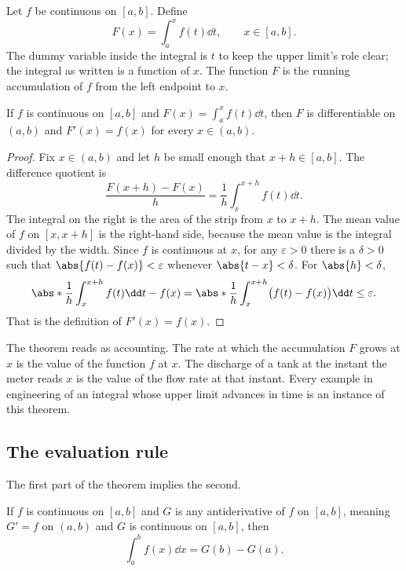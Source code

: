 Let $f$ be continuous on $[a,b]$. Define
\[
F(x) = \int_{a}^{x} f(t) \dd t, \qquad x \in [a,b].
\]
The dummy variable inside the integral is $t$ to keep the upper
limit's role clear; the integral as written is a function of $x$.
The function $F$ is the running accumulation of $f$ from the left
endpoint to $x$.

\begin{theorem}
If $f$ is continuous on $[a,b]$ and $F(x) = \int_{a}^{x} f(t) \dd t$,
then $F$ is differentiable on $(a,b)$ and
$F'(x) = f(x)$ for every $x \in (a,b)$.
\end{theorem}

\begin{proof}
Fix $x \in (a,b)$ and let $h$ be small enough that $x + h \in [a,b]$.
The difference quotient is
\[
\frac{F(x+h) - F(x)}{h} = \frac{1}{h} \int_{x}^{x+h} f(t) \dd t.
\]
The integral on the right is the area of the strip from $x$ to
$x + h$. The mean value of $f$ on $[x, x+h]$ is the right-hand side,
because the mean value is the integral divided by the width. Since
$f$ is continuous at $x$, for any $\varepsilon > 0$ there is a
$\delta > 0$ such that $\abs{f(t) - f(x)} < \varepsilon$ whenever
$\abs{t - x} < \delta$. For $\abs{h} < \delta$,
\[
\abs*{\frac{1}{h} \int_{x}^{x+h} f(t) \dd t - f(x)} =
\abs*{\frac{1}{h} \int_{x}^{x+h} \bigl(f(t) - f(x)\bigr) \dd t}
\leq \varepsilon.
\]
That is the definition of $F'(x) = f(x)$.
\end{proof}

The theorem reads as accounting. The rate at which the accumulation
$F$ grows at $x$ is the value of the function $f$ at $x$. The
discharge of a tank at the instant the meter reads $x$ is the value
of the flow rate at that instant. Every example in engineering of an
integral whose upper limit advances in time is an instance of this
theorem.

\subsection{The evaluation rule}

The first part of the theorem implies the second.

\begin{theorem}
If $f$ is continuous on $[a,b]$ and $G$ is any antiderivative of $f$
on $[a,b]$, meaning $G' = f$ on $(a,b)$ and $G$ is continuous on
$[a,b]$, then
\[
\int_{a}^{b} f(x) \dd x = G(b) - G(a).
\]
\end{theorem}

